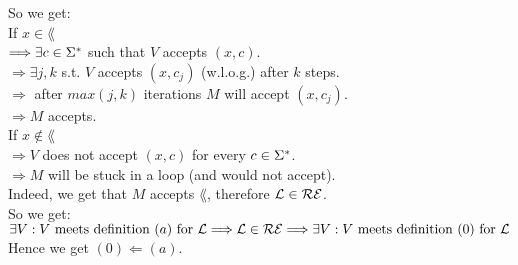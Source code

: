 So we get: \\
If $x \in \lang$ \\
$\Longrightarrow \exists c \in \Sigma^*$ such that $V$ accepts $(x, c)$. \\
$\Longrightarrow \exists j, k$ s.t. $V$ accepts $(x, c_j)$ (w.l.o.g.) after $k$ steps. \\
$\Longrightarrow$ after $max(j, k)$ iterations $M$ will accept $(x, c_j)$. \\
$\Longrightarrow M$ accepts. \\

If $x \notin \lang$ \\
$\Longrightarrow V$ does not accept $(x, c)$ for every $c \in \Sigma^*$. \\
$\Longrightarrow M$ will be stuck in a loop (and would not accept). \\

Indeed, we get that $M$ accepts $\lang$, therefore $\mathcal{L} \in \mathcal{R}\mathcal{E}$. \\
So we get: \\
$\exists V: V \text{ meets definition } (a) \text{ for } \mathcal{L} \Longrightarrow \mathcal{L} \in \mathcal{R}\mathcal{E} \Longrightarrow \exists V: V \text{ meets definition } (0) \text{ for } \mathcal{L}$ \\
Hence we get $(0) \Leftarrow (a)$. \\
